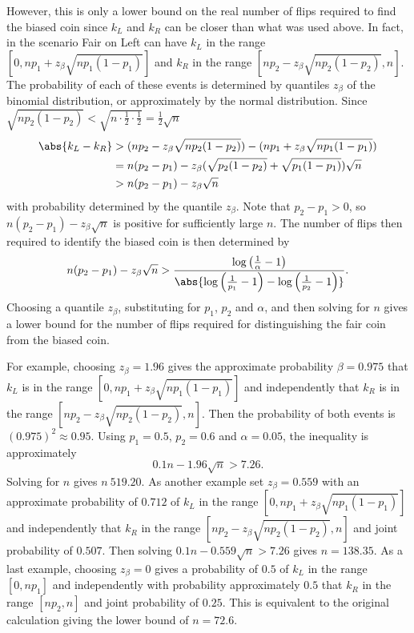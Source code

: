 \documentclass[12pt]{article}
\begin{document}
However, this is only a lower bound on the real number of flips required
to find the biased coin since \( k_L \) and \( k_R \) can be closer than
what was used above.  In fact, in the scenario Fair on Left can have \(
k_L \) in the range \( [0, np_1+z_{\beta}\sqrt{np_1(1-p_1)}] \) and \( k_R
\) in the range \( [ np_2 - z_{\beta}\sqrt{np_2(1-p_2)}, n] \).  The
probability of each of these events is determined by quantiles \( z_{\beta}
\) of the binomial distribution, or approximately by the normal
distribution.  Since \( \sqrt{np_2(1-p_2)} < \sqrt{n \cdot \frac{1}{2}
\cdot \frac{1}{2}} = \frac{1}{2}\sqrt{n} \)
\begin{align*}
    \abs{k_L - k_R} &> (np_2 - z_{\beta}\sqrt{np_2(1-p_2)}) - (np_1+z_{\beta}\sqrt
    {np_1(1-p_1)}) \\
    &= n(p_2-p_1) - z_{\beta}(\sqrt{p_2(1-p_2)} + \sqrt{p_1(1-p_1)})
    \sqrt{n} \\
    &> n(p_2-p_1) - z_{\beta} \sqrt{n}
\end{align*}
with probability determined by the quantile \( z_{\beta} \).  Note that \(
p_2-p_1 >0 \), so \( n(p_2-p_1) - z_{\beta} \sqrt{n} \) is positive for
sufficiently large \( n \). The number of flips then required to
identify the biased coin is then determined by
\[
    n(p_2-p_1) - z_{\beta} \sqrt{n} > \frac{\log \left(\frac{1}{\alpha}
    - 1 \right)}{\abs{ \log\left ( \frac{1}{p_1} - 1 \right) - \log\left
    ( \frac{1}{p_2} - 1 \right) }}.
\] Choosing a quantile \( z_{\beta} \), substituting for \( p_1 \), \( p_2
\) and \( \alpha \), and then solving for \( n \) gives a lower bound
for the number of flips required for distinguishing the fair coin from
the biased coin.

For example, choosing \( z_{\beta} = 1.96 \) gives the approximate
probability \( \beta = 0.975 \) that \( k_L \) is in the range \( [0, np_1+z_
{\beta}\sqrt{np_1(1-p_1)}] \) and independently that \( k_R \) is in the
range \( [ np_2 - z_{\beta}\sqrt{np_2(1-p_2)}, n] \).  Then the
probability of both events is \( (0.975)^2 \approx 0.95 \). Using \( p_1
= 0.5 \), \( p_2 = 0.6 \) and \( \alpha = 0.05 \), the inequality is
approximately
\[
    0.1 n - 1.96 \sqrt{n} > 7.26.
\] Solving for \( n \) gives \( n \ 519.20 \).  As another example set \(
z_{\beta} = 0.559 \) with an approximate probability of \( 0.712 \) of \(
k_L \) in the range \( [0, np_1+z_{\beta}\sqrt{np_1(1-p_1)}] \) and
independently that \( k_R \) in the range \( [ np_2 - z_{\beta}\sqrt{np_2
(1-p_2)}, n] \) and joint probability of \( 0.507 \).  Then solving \(
0.1 n - 0.559 \sqrt{n} > 7.26 \) gives \( n = 138.35 \).  As a last
example, choosing \( z_{\beta} = 0 \) gives a probability of \( 0.5 \)
of \( k_L \) in the range \( [0, np_1] \) and independently with
probability approximately \( 0.5 \) that \( k_R \) in the range \( [ np_2,
n] \) and joint probability of \( 0.25 \).  This is equivalent to the
original calculation giving the lower bound of \( n=72.6 \).
\end{document}
